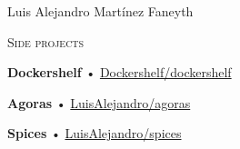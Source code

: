 \documentclass[12pt]{article}
\begin{document}
\begin{cv}{Luis Alejandro Mart\'inez Faneyth}
\begin{minipage}[t]{0.35\textwidth}
    \vspace{0.25em}
    \begin{minipage}{\linewidth}
      \textrm{\textsc{\Large{Side projects}}}
      \newline
      \parbox[t]{\linewidth}{
        \textbf{Dockershelf} • \href{https://github.com/Dockershelf/dockershelf}{Dockershelf/dockershelf}\\
      }
      \parbox[t]{\linewidth}{
        \textbf{Agoras} • \href{https://github.com/LuisAlejandro/agoras}{LuisAlejandro/agoras}\\
      }
      \parbox[t]{\linewidth}{
        \textbf{Spices} • \href{https://github.com/LuisAlejandro/spices}{LuisAlejandro/spices}\\
      }
    \end{minipage}
  
  \end{minipage}\hspace{0.5cm}
  \begin{minipage}[t]{0.55\textwidth}
    \vspace{0.125em}


\end{minipage}
\end{cv}
\end{document}
